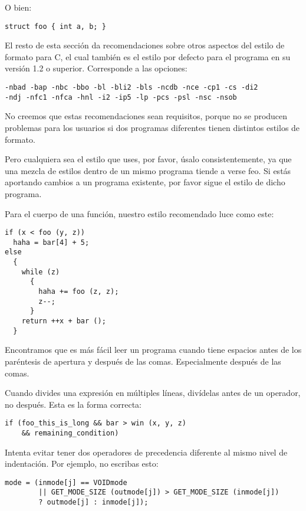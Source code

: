 O bien:

\begin{verbatim}
struct foo { int a, b; }
\end{verbatim}

El resto de esta sección da recomendaciones sobre otros aspectos del estilo de formato para C, el cual también es el estilo por defecto para el programa en su versión 1.2 o superior. Corresponde a las opciones:

\begin{verbatim}
-nbad -bap -nbc -bbo -bl -bli2 -bls -ncdb -nce -cp1 -cs -di2
-ndj -nfc1 -nfca -hnl -i2 -ip5 -lp -pcs -psl -nsc -nsob
\end{verbatim}

No creemos que estas recomendaciones sean requisitos, porque no se producen problemas para los usuarios si dos programas diferentes tienen distintos estilos de formato.

Pero cualquiera sea el estilo que uses, por favor, úsalo consistentemente, ya que una mezcla de estilos dentro de un mismo programa tiende a verse feo. Si estás aportando cambios a un programa existente, por favor sigue el estilo de dicho programa.

Para el cuerpo de una función, nuestro estilo recomendado luce como este:

\begin{verbatim}
if (x < foo (y, z))
  haha = bar[4] + 5;
else
  {
    while (z)
      {
        haha += foo (z, z);
        z--;
      }
    return ++x + bar ();
  }
\end{verbatim}
 
Encontramos que es más fácil leer un programa cuando tiene espacios antes de los paréntesis de apertura y después de las comas. Especialmente después de las comas.

Cuando divides una expresión en múltiples líneas, divídelas antes de un operador, no después. Esta es la forma correcta:

\begin{verbatim}
if (foo_this_is_long && bar > win (x, y, z)
    && remaining_condition)
\end{verbatim}

Intenta evitar tener dos operadores de precedencia diferente al mismo nivel de indentación. Por ejemplo, no escribas esto:

\begin{verbatim}
mode = (inmode[j] == VOIDmode
        || GET_MODE_SIZE (outmode[j]) > GET_MODE_SIZE (inmode[j])
        ? outmode[j] : inmode[j]);
\end{verbatim}


